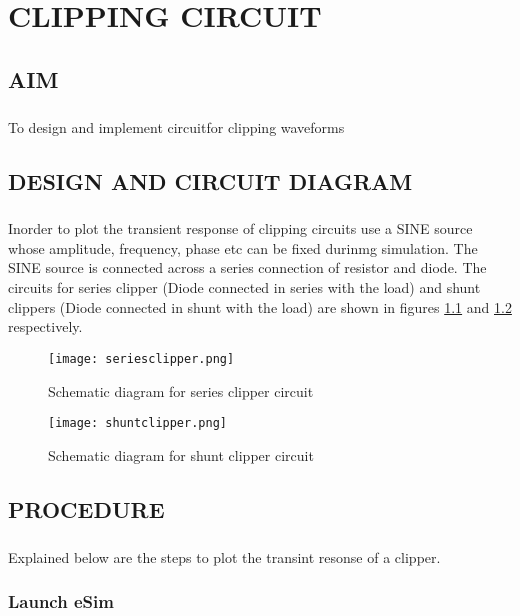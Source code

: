 \chapter{CLIPPING CIRCUIT}

\section*{AIM}
\paragraph{}To design and implement circuitfor clipping waveforms
\section*{DESIGN AND CIRCUIT DIAGRAM}
\paragraph{}

Inorder to plot the transient response of clipping circuits use a SINE source whose amplitude, frequency, phase etc can be fixed durinmg simulation. The SINE source is connected across a series connection of resistor and diode. The circuits for series clipper (Diode connected in series with the load) and shunt clippers (Diode connected in shunt with the load)  are shown in figures \ref{seriesclipper} and  \ref{shuntclipper} respectively. 


\begin{figure}[h]
\centering
\texttt{[image: seriesclipper.png]}
\caption{Schematic diagram for series clipper circuit}
\label{seriesclipper}
\end{figure}

\begin{figure}[h]
\centering
\texttt{[image: shuntclipper.png]}
\caption{Schematic diagram for shunt clipper circuit}
\label{shuntclipper}
\end{figure}

\section*{PROCEDURE}

\paragraph{}Explained below are the steps to plot the transint resonse of a clipper. 
\subsection{Launch eSim}


